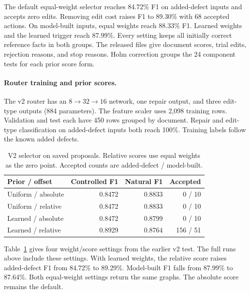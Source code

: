 The default equal-weight selector reaches 84.72\% F1 on added-defect inputs
and accepts zero edits. Removing edit cost raises F1 to 89.30\% with
68 accepted actions. On model-built inputs, equal weights reach 88.33\% F1.
Learned weights and the learned trigger reach 87.99\%.
Every setting keeps all initially correct reference facts in both groups.
The released files give document scores, trial edits, rejection reasons,
and stop reasons. Holm correction groups the 24 component tests for each
prior score form.

\paragraph{Router training and prior scores.}

The v2 router has an $8\!\rightarrow\!32\!\rightarrow\!16$ network,
one repair output, and three edit-type outputs (884 parameters).
The feature scaler uses 2,098 training rows. Validation and test each have
450 rows grouped by document. Repair and edit-type classification on
added-defect inputs both reach 100\%.
Training labels follow the known added defects.

\begin{table}[t]
\centering
\caption{V2 selector on saved proposals. Relative scores use equal weights as the zero point. Accepted counts are added-defect / model-built.}
\label{tab:math_revision_selector}
\small
\begin{tabular}{lrrr}
\toprule
Prior / offset & Controlled F1 & Natural F1 & Accepted \\
\midrule
Uniform / absolute & 0.8472 & 0.8833 & 0 / 10 \\
Uniform / relative & 0.8472 & 0.8833 & 0 / 10 \\
Learned / absolute & 0.8472 & 0.8799 & 0 / 10 \\
Learned / relative & 0.8929 & 0.8764 & 156 / 51 \\
\bottomrule
\end{tabular}
\end{table}


Table~\ref{tab:math_revision_selector} gives four weight/score settings
from the earlier v2 test. The full runs above include these settings.
With learned weights, the relative score raises added-defect F1 from
84.72\% to 89.29\%. Model-built F1 falls from 87.99\% to 87.64\%.
Both equal-weight settings return the same graphs.
The absolute score remains the default.

